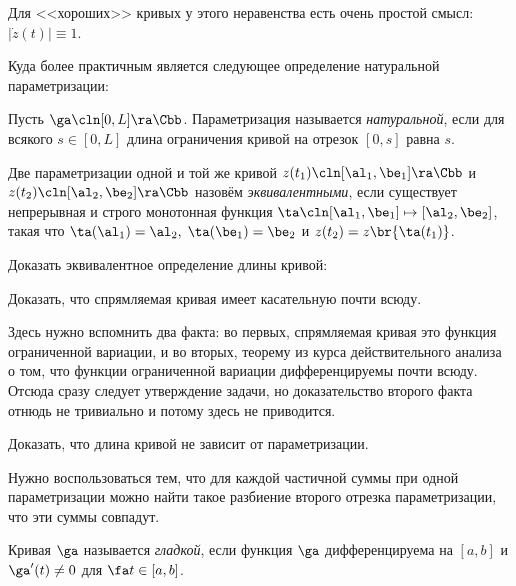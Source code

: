 \documentclass[a4paper]{article}
\begin{document}
Для <<хороших>> кривых у этого неравенства есть очень простой смысл: $|\dot z(t)|\equiv 1$.

\begin{petit}
Куда более практичным является следующее определение натуральной параметризации:

\begin{df}
Пусть $\ga\cln [0,L] \ra \Cbb$. Параметризация называется \emph{натуральной}, если для всякого $s \in [0,L]$
длина ограничения кривой на отрезок $[0,s]$ равна $s$.
\end{df}
\end{petit}


\begin{df}
Две параметризации одной и той же кривой $z(t_1)\cln[\al_1,\be_1]\ra \Cbb$ и $z(t_2)\cln[\al_2,\be_2]\ra \Cbb$
назовём \emph{эквивалентными}, если существует непрерывная и строго монотонная
функция $\ta\cln [\al_1,\be_1]\mapsto [\al_2,\be_2]$, такая что $\ta(\al_1)=\al_2, \; \ta(\be_1)=\be_2$
и $z(t_2) = z\br{\ta(t_1)}$.
\end{df}

\begin{problem}
Доказать эквивалентное определение длины кривой:
\end{problem}

\begin{problem}
Доказать, что спрямляемая кривая имеет касательную почти всюду.
\end{problem}
\begin{hint}
Здесь нужно вспомнить два факта: во первых, спрямляемая кривая это функция
ограниченной вариации, и во вторых, теорему из курса действительного анализа
о том, что функции ограниченной вариации дифференцируемы почти всюду.
Отсюда сразу следует утверждение задачи, но доказательство второго факта
отнюдь не тривиально и потому здесь не приводится.
\end{hint}

\begin{problem}
Доказать, что длина кривой не зависит от параметризации.
\end{problem}
\begin{hint}
Нужно воспользоваться тем, что для каждой частичной суммы при одной параметризации
можно найти такое разбиение второго отрезка параметризации, что эти суммы совпадут.
\end{hint}

\begin{df}
Кривая $\ga$ называется \emph{гладкой}, если функция $\ga$ дифференцируема
на $[a,b]$ и $\ga'(t) \ne 0$ для $\fa t \in [a,b]$.
\end{df}
\end{document}
